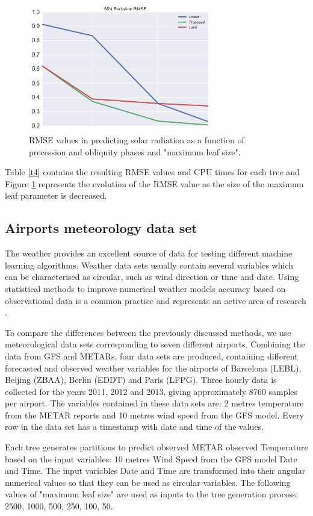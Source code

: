 \documentclass[times,twocolumn,final,authoryear]{elsarticle}
\begin{document}
\begin{figure}
  \includegraphics[width=8cm]{milankovitch_fig.png}
  \caption{RMSE values in predicting solar radiation as a function of precession and obliquity phases and "maximum leaf size".}
\label{f_tbn}
\end{figure}

Table \ref{t4} contains the resulting RMSE values and CPU times for each tree and Figure \ref{f_tbn} represents the evolution of the RMSE value as the size of the maximum leaf parameter is decreased.

\subsection{Airports meteorology data set}

The weather provides an excellent source of data for testing different machine learning algorithms. Weather data sets usually contain several variables which can be characterised as circular, such as wind direction or time and date. Using statistical methods to improve numerical weather models accuracy based on observational data is a common practice and represents an active area of research \citep{Larraondoetal2014, Salamehetal2009}.

To compare the differences between the previously discussed methods, we use meteorological data sets corresponding to seven different airports. Combining the data from GFS and METARs, four data sets are produced, containing different forecasted and observed weather variables for the airports of Barcelona (LEBL), Beijing (ZBAA), Berlin (EDDT) and Paris (LFPG). Three hourly data is collected for the years 2011, 2012 and 2013, giving approximately 8760 samples per airport. The variables contained in these data sets are: 2 metres temperature from the METAR reports and 10 metres wind speed from the GFS model. Every row in the data set has a timestamp with date and time of the values. 

Each tree generates partitions to predict observed METAR observed Temperature based on the input variables: 10 metres Wind Speed from the GFS model Date and Time. 
The input variables Date and Time are transformed into their angular numerical values so that they can be used as circular variables. The following values of "maximum leaf size" are used as inputs to the tree generation process: 2500, 1000, 500, 250, 100, 50.
\end{document}
